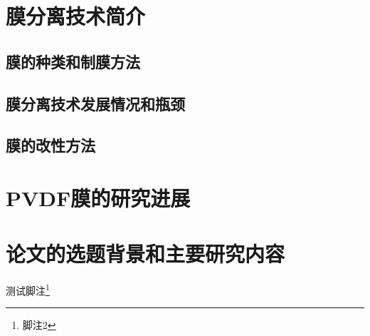 \section{膜分离技术简介}
\subsection{膜的种类和制膜方法}
\subsection{膜分离技术发展情况和瓶颈}
\subsection{膜的改性方法}
\section{PVDF膜的研究进展}

\section{论文的选题背景和主要研究内容}

测试脚注\footnote{脚注2}
